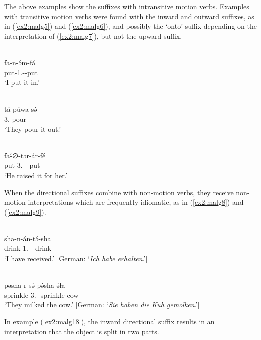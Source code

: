 The above examples show the suffixes with intransitive motion verbs. Examples with transitive motion verbs were found with the inward and outward suffixes, as in (\ref{ex2:malg5}) and (\ref{ex2:malg6}), and possibly the `onto' suffix depending on the interpretation of (\ref{ex2:malg7}), but not the upward suffix. 

\ea\label{ex2:malg5}
 \\
\gll fa-n-ə́m-fá \\
put-1.--put \\
\glt `I put it in.'

\ex\label{ex2:malg6}
 \\
\gll tá púwa-sə́ \\
3. pour- \\
\glt `They pour it out.'

\ex\label{ex2:malg7}
 \\
\gll fa-́∅-tər-ár-fé \\
put-3.---put	\\
\glt `He raised it for her.'
\z 

When the directional suffixes combine with non-motion verbs, they receive non-motion interpretations which are frequently idiomatic, as in (\ref{ex2:malg8}) and (\ref{ex2:malg9}). 

\ea\label{ex2:malg8}
 \\
\gll sha-n-án-tə́-sha \\
drink-1.---drink \\
\glt `I have received.' [German: `\textit{Ich habe erhalten}.']

\ex\label{ex2:malg9}
 \\
\gll pəsha-r-sə́-pə́sha ə́ɬa \\
sprinkle-3.--sprinkle cow \\
\glt `They milked the cow.' [German: `\textit{Sie haben die Kuh gemolken}.']
\z 

In example (\ref{ex2:malg18}), the inward directional suffix results in an interpretation that the object is split in two parts. 

